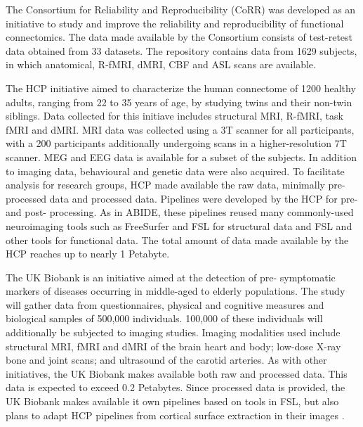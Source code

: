 \documentclass{report}
\begin{document}
            The Consortium for Reliability and Reproducibility (CoRR) was developed as an initiative to study 
            and improve the 
            reliability and reproducibility of functional connectomics. The 
            data made available by the Consortium consists of test-retest data 
            obtained from 33 datasets. The repository contains data from 1629 
            subjects, in which anatomical, R-fMRI, dMRI, CBF and ASL scans are 
            available.


            The HCP initiative aimed to characterize the human connectome of 
            1200 healthy adults, ranging from 22 to 35 years of age, by studying
            twins and their non-twin siblings. Data collected for this initiave
            includes structural MRI, R-fMRI, task fMRI and dMRI. MRI data was
            collected using a 3T scanner for all participants, with a 200 
            participants additionally undergoing scans in a higher-resolution 7T
            scanner. MEG and EEG data is available for a subset of the subjects. 
            In addition to imaging data, behavioural and genetic data were also 
            acquired. To facilitate analysis for research groups, HCP made 
            available the raw data, minimally pre-processed data and processed 
            data. Pipelines were developed by the HCP for pre- and post-
            processing. As in ABIDE, these pipelines reused many commonly-used
            neuroimaging tools such as FreeSurfer and FSL for structural data
            and FSL and other tools for functional data. The total amount of
            data made available by the HCP reaches up to nearly 1 Petabyte.


            The UK Biobank is an initiative aimed at the detection of pre-
            symptomatic markers of diseases occurring in middle-aged to elderly 
            populations. The study will gather data from questionnaires, 
            physical and cognitive measures and biological samples of 500,000
            individuals. 100,000 of these individuals will additionally be 
            subjected to imaging studies. Imaging modalities used include
            structural MRI, fMRI and dMRI of the brain heart and body; low-dose
            X-ray bone and joint scans; and ultrasound of the carotid arteries.
            As with other initiatives, the UK Biobank makes available both 
            raw and processed data. This data is expected to exceed 0.2 
            Petabytes. Since processed data is provided, the UK Biobank makes 
            available it own pipelines based on tools in FSL, but also plans to
            adapt HCP pipelines from cortical surface extraction in their images
            .
\end{document}
